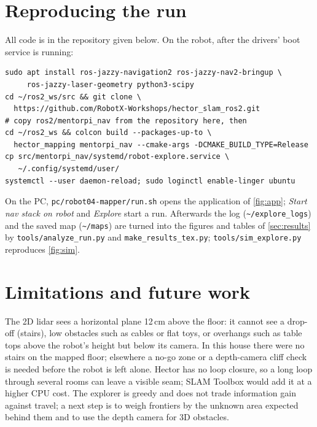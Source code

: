 \documentclass[10pt,twocolumn]{article}
\begin{document}
\section{Reproducing the run}\label{sec:reproduce}
All code is in the repository given below. On the robot, after the drivers' boot service is running:
\begin{lstlisting}
sudo apt install ros-jazzy-navigation2 ros-jazzy-nav2-bringup \
     ros-jazzy-laser-geometry python3-scipy
cd ~/ros2_ws/src && git clone \
  https://github.com/RobotX-Workshops/hector_slam_ros2.git
# copy ros2/mentorpi_nav from the repository here, then
cd ~/ros2_ws && colcon build --packages-up-to \
  hector_mapping mentorpi_nav --cmake-args -DCMAKE_BUILD_TYPE=Release
cp src/mentorpi_nav/systemd/robot-explore.service \
   ~/.config/systemd/user/
systemctl --user daemon-reload; sudo loginctl enable-linger ubuntu
\end{lstlisting}
On the PC, \texttt{pc/robot04-mapper/run.sh} opens the application of \cref{fig:app}; \emph{Start nav stack on
robot} and \emph{Explore} start a run. Afterwards the log (\texttt{\textasciitilde/explore\_logs}) and the saved
map (\texttt{\textasciitilde/maps}) are turned into the figures and tables of \cref{sec:results} by
\texttt{tools/analyze\_run.py} and \texttt{make\_results\_tex.py}; \texttt{tools/sim\_explore.py} reproduces
\cref{fig:sim}.

\section{Limitations and future work}
The 2D lidar sees a horizontal plane 12\,cm above the floor: it cannot see a drop-off (stairs),
low obstacles such as cables or flat toys, or overhangs such as table tops above the robot's
height but below its camera. In this house there were no stairs on the mapped floor; elsewhere
a no-go zone or a depth-camera cliff check is needed before the robot is left alone. Hector
has no loop closure, so a long loop through several rooms can leave a visible seam; SLAM
Toolbox would add it at a higher CPU cost. The explorer is greedy and does not trade
information gain against travel; a next step is to weigh frontiers by the unknown area expected
behind them and to use the depth camera for 3D obstacles.
\end{document}
